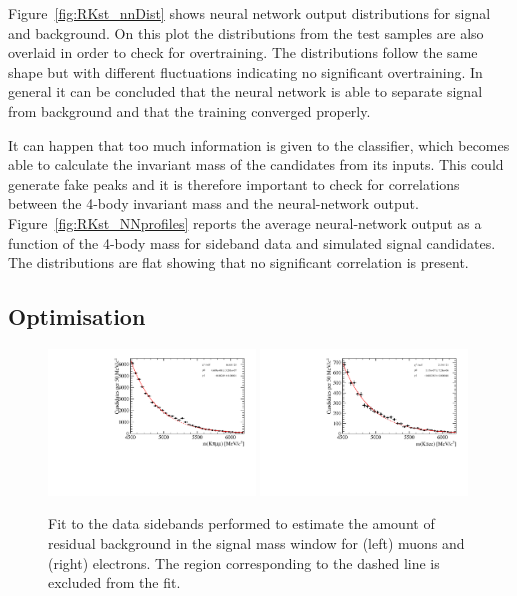 Figure~\ref{fig:RKst_nnDist} shows neural network output distributions for signal and background.
On this plot the distributions from the test samples are also overlaid in order to check for overtraining. 
The distributions follow the same shape but with different fluctuations indicating no
significant overtraining. In general it can be concluded that the neural network is able to separate signal
from background and that the training converged properly.

It can happen that too much information is given to the classifier, which becomes able to 
calculate the invariant mass of the candidates from its inputs. This could generate fake peaks and it is therefore
important to check for correlations between the 4-body invariant mass and the neural-network output. Figure~\ref{fig:RKst_NNprofiles} reports
the average neural-network output as a function of the 4-body mass for sideband data and simulated signal candidates.
The distributions are flat showing that no significant correlation is present.


\subsection{Optimisation}
\label{sec:optimisation}

\begin{figure}[t!]
\centering
\includegraphics[width=0.49\textwidth]{RKst/figs/Optimisation/optimizeCut_MM-q2central/fitB_MM_0.pdf}
\includegraphics[width=0.49\textwidth]{RKst/figs/Optimisation/optimizeCut_EE-q2central/fitB_EE_0.pdf}
\caption{Fit to the data sidebands performed to estimate the amount of residual background in the
signal mass window for (left) muons and (right) electrons. The region corresponding to the dashed line is excluded from the fit.}
\label{fig:sideband_fit}
\end{figure}

